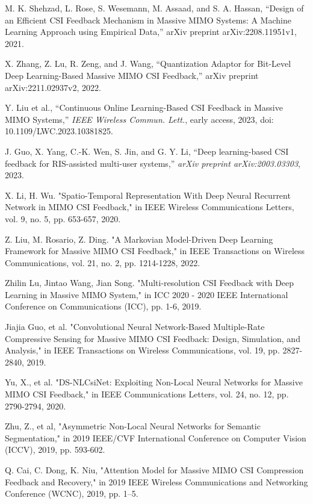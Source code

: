 \documentclass[lettersize,journal]{IEEEtran}
\begin{document}
\begin{thebibliography}{00}
    M. K. Shehzad, L. Rose, S. Wesemann, M. Assaad, and S. A. Hassan, ``Design of an Efficient CSI Feedback Mechanism in Massive MIMO Systems: A Machine Learning Approach using Empirical Data,'' arXiv preprint arXiv:2208.11951v1, 2021.

    X. Zhang, Z. Lu, R. Zeng, and J. Wang, ``Quantization Adaptor for Bit-Level Deep Learning-Based Massive MIMO CSI Feedback,'' arXiv preprint arXiv:2211.02937v2, 2022.

    Y. Liu et al., ``Continuous Online Learning-Based CSI Feedback in Massive MIMO Systems,'' \textit{IEEE Wireless Commun. Lett.}, early access, 2023, doi: 10.1109/LWC.2023.10381825.

    J. Guo, X. Yang, C.-K. Wen, S. Jin, and G. Y. Li, ``Deep learning-based CSI feedback for RIS-assisted multi-user systems,'' \textit{arXiv preprint arXiv:2003.03303}, 2023.

    X. Li, H. Wu. "Spatio-Temporal Representation With Deep Neural Recurrent Network in MIMO CSI Feedback," in IEEE Wireless Communications Letters, vol. 9, no. 5, pp. 653-657, 2020.

    Z. Liu, M. Rosario, Z. Ding. "A Markovian Model-Driven Deep Learning Framework for Massive MIMO CSI Feedback," in IEEE Transactions on Wireless Communications, vol. 21, no. 2, pp. 1214-1228, 2022.

    Zhilin Lu, Jintao Wang, Jian Song. "Multi-resolution CSI Feedback with Deep Learning in Massive MIMO System," in ICC 2020 - 2020 IEEE International Conference on Communications (ICC), pp. 1-6, 2019.

    Jiajia Guo, et al. "Convolutional Neural Network-Based Multiple-Rate Compressive Sensing for Massive MIMO CSI Feedback: Design, Simulation, and Analysis," in IEEE Transactions on Wireless Communications, vol. 19, pp. 2827-2840, 2019.

    Yu, X., et al. "DS-NLCsiNet: Exploiting Non-Local Neural Networks for Massive MIMO CSI Feedback," in IEEE Communications Letters, vol. 24, no. 12, pp. 2790-2794, 2020.

    Zhu, Z., et al, "Asymmetric Non-Local Neural Networks for Semantic Segmentation," in 2019 IEEE/CVF International Conference on Computer Vision (ICCV), 2019, pp. 593-602.

    Q. Cai, C. Dong, K. Niu, "Attention Model for Massive MIMO CSI Compression Feedback and Recovery," in 2019 IEEE Wireless Communications and Networking Conference (WCNC), 2019, pp. 1–5.


\end{thebibliography}
\end{document}
